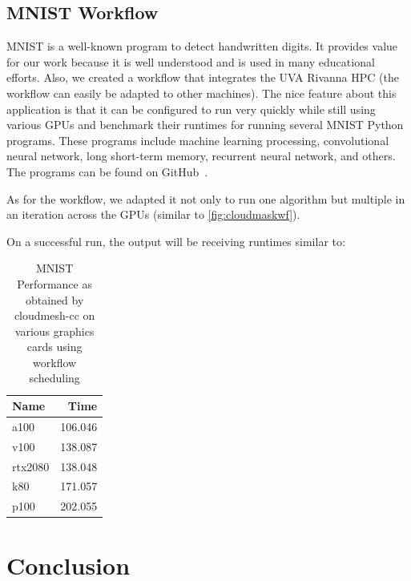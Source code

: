 %


\subsection{MNIST Workflow}\label{mnist-workflow}

MNIST is a well-known program to detect handwritten digits. It
provides value for our work because it is well understood and is used
in many educational efforts. Also, we created a workflow that
integrates the UVA Rivanna HPC (the workflow can easily be adapted to other
machines). The nice feature about this application is that it can be
configured to run very quickly while still using various GPUs and
benchmark their runtimes for running several MNIST Python
programs. These programs include machine learning processing,
convolutional neural network, long short-term memory, recurrent neural
network, and others. The programs can be found on
GitHub~\cite{www-mnist-programs}.

As for the workflow, we adapted it not only to run one algorithm but
multiple in an iteration across the GPUs (similar to
\ref{fig:cloudmaskwf}).

On a successful run, the output will be receiving runtimes similar to:

\begin{table}[!ht]
\caption{MNIST Performance as obtained by cloudmesh-cc on various graphics cards using workflow scheduling}
    \centering
    \begin{tabular}{lr}
    \hline
        Name & Time \\ \hline
        a100 & 106.046 \\ 
        v100 & 138.087 \\ 
        rtx2080 & 138.048 \\
        k80 & 171.057 \\ 
        p100 & 202.055 \\
    \end{tabular}
    \label{table:mnist-times}
  \end{table}
  


% 


\section{Conclusion}

